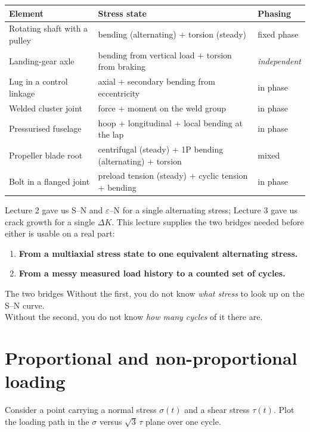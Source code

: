 \documentclass[11pt,a4paper]{article}
\begin{document}
\begin{center}\small
\begin{tabular}{@{}lll@{}}
\toprule
Element & Stress state & Phasing \\
\midrule
Rotating shaft with a pulley & bending (alternating) $+$ torsion (steady) & fixed phase \\
Landing-gear axle & bending from vertical load $+$ torsion from braking & \emph{independent} \\
Lug in a control linkage & axial $+$ secondary bending from eccentricity & in phase \\
Welded cluster joint & force $+$ moment on the weld group & in phase \\
Pressurised fuselage & hoop $+$ longitudinal $+$ local bending at the lap & in phase \\
Propeller blade root & centrifugal (steady) $+$ 1P bending (alternating) $+$ torsion & mixed \\
Bolt in a flanged joint & preload tension (steady) $+$ cyclic tension $+$ bending & in phase \\
\bottomrule
\end{tabular}
\end{center}

Lecture 2 gave us S--N and $\varepsilon$--N for a single alternating stress; Lecture 3 gave us crack growth for a single $\Delta K$. This lecture supplies the two bridges needed before either is usable on a real part:

\begin{enumerate}[nosep]
  \item \textbf{From a multiaxial stress state to one equivalent alternating stress.}
  \item \textbf{From a messy measured load history to a counted set of cycles.}
\end{enumerate}

\begin{keybox}{The two bridges}
Without the first, you do not know \emph{what stress} to look up on the S--N curve.\\
Without the second, you do not know \emph{how many cycles} of it there are.
\end{keybox}

\section{Proportional and non-proportional loading}

Consider a point carrying a normal stress $\sigma(t)$ and a shear stress $\tau(t)$. Plot the loading path in the $\sigma$ versus $\sqrt3\,\tau$ plane over one cycle.
\end{document}
